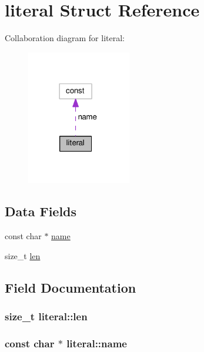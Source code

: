 \hypertarget{structliteral}{}\section{literal Struct Reference}
\label{structliteral}


Collaboration diagram for literal\+:
\nopagebreak
\begin{figure}[H]
\begin{center}
\leavevmode
\includegraphics[width=129pt]{structliteral__coll__graph}
\end{center}
\end{figure}
\subsection*{Data Fields}
\begin{DoxyCompactItemize}
\item 
const char $\ast$ \hyperlink{structliteral_a777ad8bcd4d7c377eb17584e259f4e5a}{name}
\item 
size\+\_\+t \hyperlink{structliteral_ac4694249c2db13e60400385d500f9381}{len}
\end{DoxyCompactItemize}


\subsection{Field Documentation}
\subsubsection[{\texorpdfstring{len}{len}}]{\setlength{\rightskip}{0pt plus 5cm}size\+\_\+t literal\+::len}\hypertarget{structliteral_ac4694249c2db13e60400385d500f9381}{}\label{structliteral_ac4694249c2db13e60400385d500f9381}
\subsubsection[{\texorpdfstring{name}{name}}]{\setlength{\rightskip}{0pt plus 5cm}const char $\ast$ literal\+::name}\hypertarget{structliteral_a777ad8bcd4d7c377eb17584e259f4e5a}{}\label{structliteral_a777ad8bcd4d7c377eb17584e259f4e5a}



